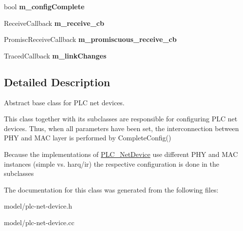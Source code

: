 \begin{DoxyCompactItemize}
\item 
\hypertarget{classns3_1_1PLC__NetDevice_aee77958923cbffff0b36eabbd7d2070c}{bool {\bfseries m\-\_\-config\-Complete}}\label{classns3_1_1PLC__NetDevice_aee77958923cbffff0b36eabbd7d2070c}

\item 
\hypertarget{classns3_1_1PLC__NetDevice_a75e3b812861262923c0214944909b6ca}{\-Receive\-Callback {\bfseries m\-\_\-receive\-\_\-cb}}\label{classns3_1_1PLC__NetDevice_a75e3b812861262923c0214944909b6ca}

\item 
\hypertarget{classns3_1_1PLC__NetDevice_a52a324c2aa527f46d85fbfa461429f0e}{\-Promisc\-Receive\-Callback {\bfseries m\-\_\-promiscuous\-\_\-receive\-\_\-cb}}\label{classns3_1_1PLC__NetDevice_a52a324c2aa527f46d85fbfa461429f0e}

\item 
\hypertarget{classns3_1_1PLC__NetDevice_a4a6969b2c70fe6dc7c865990a6546d25}{\-Traced\-Callback {\bfseries m\-\_\-link\-Changes}}\label{classns3_1_1PLC__NetDevice_a4a6969b2c70fe6dc7c865990a6546d25}

\end{DoxyCompactItemize}


\subsection{\-Detailed \-Description}
\-Abstract base class for \-P\-L\-C net devices. 

\-This class together with its subclasses are responsible for configuring \-P\-L\-C net devices. \-Thus, when all parameters have been set, the interconnection between \-P\-H\-Y and \-M\-A\-C layer is performed by \-Complete\-Config()

\-Because the implementations of \hyperlink{classns3_1_1PLC__NetDevice}{\-P\-L\-C\-\_\-\-Net\-Device} use different \-P\-H\-Y and \-M\-A\-C instances (simple vs. harq/ir) the respective configuration is done in the subclasses 

\-The documentation for this class was generated from the following files\-:\begin{DoxyCompactItemize}
\item 
model/plc-\/net-\/device.\-h\item 
model/plc-\/net-\/device.\-cc\end{DoxyCompactItemize}
